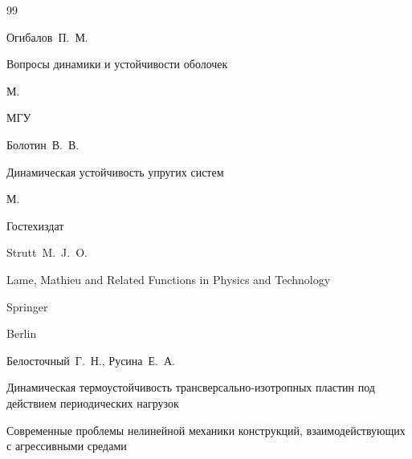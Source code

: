 \begin{thebibliography}{99}





\by Огибалов~П.~М.

\book Вопросы динамики и устойчивости оболочек

\publaddr М.

\publ МГУ






\by Болотин~В.~В.

\book Динамическая устойчивость упругих систем

\publaddr М.

\publ Гостехиздат






\by Strutt~M.~J.~O. 

\book Lame, Mathieu and Related Functions in Physics and Technology 

\publ Springer

\publaddr Berlin















\by Белосточный~Г.~Н., Русина~Е.~А.

\paper  Динамическая термоустойчивость трансверсально-изотропных пластин под действием периодических нагрузок

\inbook Современные проблемы нелинейной механики конструкций, взаимодействующих с агрессивными средами


\end{thebibliography}
